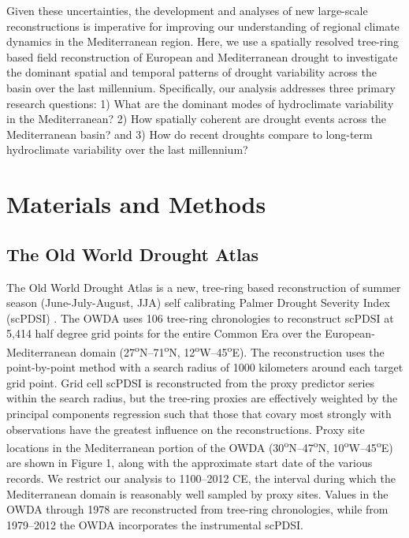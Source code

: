 \documentclass[draft,jgr]{AGUTeX}
\begin{document}
\begin{article}
\indent Given these uncertainties, the development and analyses of new large-scale reconstructions is imperative for improving our understanding of regional climate dynamics in the Mediterranean region. Here, we use a spatially resolved tree-ring based field reconstruction of European and Mediterranean drought to investigate the dominant spatial and temporal patterns of drought variability across the basin over the last millennium. Specifically, our analysis addresses three primary research questions: 1) What are the dominant modes of hydroclimate variability in the Mediterranean? 2) How spatially coherent are drought events across the Mediterranean basin? and 3) How do recent droughts compare to long-term hydroclimate variability over the last millennium?

\section{Materials and Methods}
\subsection{The Old World Drought Atlas}
\noindent The Old World Drought Atlas \citep[OWDA;][]{CookOWDA2015} is a new, tree-ring based reconstruction of summer season (June-July-August, JJA) self calibrating Palmer Drought Severity Index (scPDSI) \citep{Schrier2013}. The OWDA uses 106 tree-ring chronologies to reconstruct scPDSI at 5,414 half degree grid points for the entire Common Era over the European-Mediterranean domain (27\textsuperscript{o}N--71\textsuperscript{o}N, 12\textsuperscript{o}W--45\textsuperscript{o}E). The reconstruction uses the point-by-point method \citep{Cook1999,CookER2013} with a search radius of 1000 kilometers around each target grid point. Grid cell scPDSI is reconstructed from the proxy predictor series within the search radius, but the tree-ring proxies are effectively weighted by the principal components regression such that those that covary most strongly with observations have the greatest influence on the reconstructions. Proxy site locations in the Mediterranean portion of the OWDA (30\textsuperscript{o}N--47\textsuperscript{o}N, 10\textsuperscript{o}W--45\textsuperscript{o}E) are shown in Figure 1, along with the approximate start date of the various records. We restrict our analysis to 1100--2012 CE, the interval during which the Mediterranean domain is reasonably well sampled by proxy sites. Values in the OWDA through 1978 are reconstructed from tree-ring chronologies, while from 1979--2012 the OWDA incorporates the instrumental scPDSI. 


\end{article}
\end{document}
